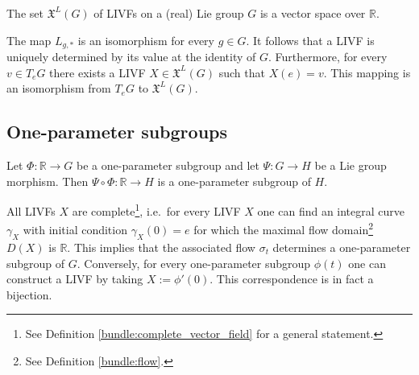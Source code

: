     \begin{property}
        The set $\mathfrak{X}^L(G)$ of LIVFs on a (real) Lie group $G$ is a vector space over $\mathbb{R}$.
    \end{property}
    \begin{property}\label{lie:livf_prop}
        The map $L_{g,\ast}$ is an isomorphism for every $g\in G$. It follows that a LIVF is uniquely determined by its value at the identity of $G$. Furthermore, for every $v\in T_eG$ there exists a LIVF $X\in\mathfrak{X}^L(G)$ such that $X(e)=v$. This mapping is an isomorphism from $T_eG$ to $\mathfrak{X}^L(G)$.
    \end{property}

\subsection{One-parameter subgroups}

    \begin{property}\label{lie:OPS_composition}
        Let $\Phi:\mathbb{R}\rightarrow G$ be a one-parameter subgroup and let $\Psi:G\rightarrow H$ be a Lie group morphism. Then $\Psi\circ\Phi:\mathbb{R}\rightarrow H$ is a one-parameter subgroup of $H$.
    \end{property}

    \begin{property}\label{lie:livf_subgroup}
        All LIVFs $X$ are complete\footnote{See Definition \ref{bundle:complete_vector_field} for a general statement.}, i.e.~for every LIVF $X$ one can find an integral curve $\gamma_X$ with initial condition $\gamma_X(0) = e$ for which the maximal flow domain\footnote{See Definition \ref{bundle:flow}.} $D(X)$ is $\mathbb{R}$. This implies that the associated flow $\sigma_t$ determines a one-parameter subgroup of $G$. Conversely, for every one-parameter subgroup $\phi(t)$ one can construct a LIVF by taking $X := \phi'(0)$. This correspondence is in fact a bijection.
    \end{property}

